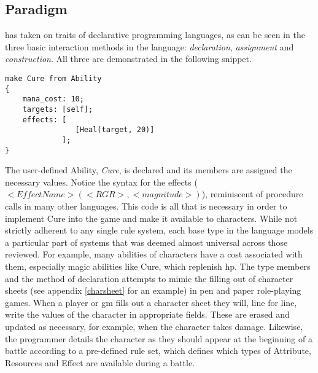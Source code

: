 \subsection{Paradigm}
\label{language:paradigm}
\langname{} has taken on traits of declarative programming languages, as can be seen in the three basic interaction methods in the language: \emph{declaration}, \emph{assignment} and \emph{construction}.
All three are demonstrated in the following snippet. %

\begin{lstlisting}[language=fflang]
make Cure from Ability
{
	mana_cost: 10;
	targets: [self];
	effects: [
				[Heal(target, 20)]
			 ];
}
\end{lstlisting}

The user-defined Ability, \emph{Cure}, is declared and its members are assigned the necessary values. Notice the syntax for the effects ($<EffectName>(<RGR>,<magnitude>)$), reminiscent of procedure calls in many other languages. This code is all that is necessary in order to implement Cure into the game and make it available to characters.
While not strictly adherent to any single rule system, each base type in the language models a particular part of systems that was deemed almost universal across those reviewed. For example, many abilities of characters have a cost associated with them, especially magic abilities like Cure, which replenish \ac{hp}. %
The type members and the method of declaration attempts to mimic the filling out of character sheets (see appendix \vref{charsheet} for an example) in pen and paper role-playing games. When a player or \ac{gm} fills out a character sheet they will, line for line, write the values of the character in appropriate fields. These are erased and updated as necessary, for example, when the character takes damage.
Likewise, the programmer details the character as they should appear at the beginning of a battle according to a pre-defined rule set, which defines which types of Attribute, Resources and Effect are available during a battle.
